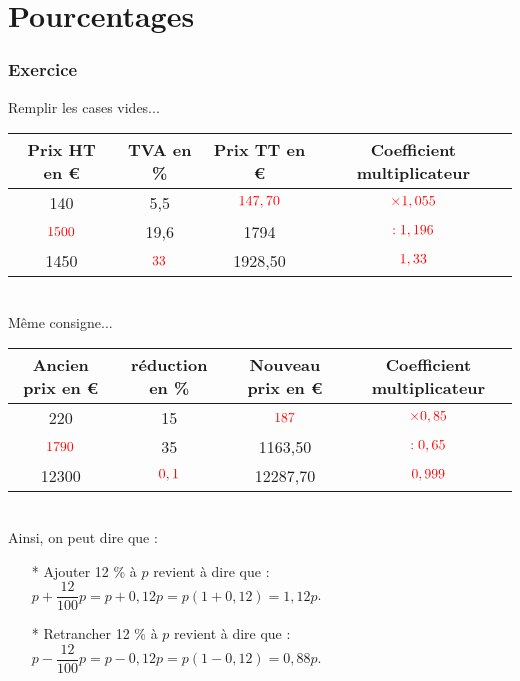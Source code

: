 \ifdefined\COMPLETE
\else
    
    
\fi


\setcounter{section}{0} 

\part{Pourcentages}

\section{Exercice }

Remplir les cases vides... \\

\begin{tabular}{c|c|c|c} 
Prix HT en € & TVA en \% & Prix TT en € & Coefficient multiplicateur \\
\hline
140 & 5,5 & $\textcolor{red}{147,70}$ & $\textcolor{red}{\times 1,055}$ \\
$\textcolor{red}{1500}$& 19,6 & 1794 & $\textcolor{red}{: 1,196}$ \\
1450 & $\textcolor{red}{33}$ & 1928,50 & $\textcolor{red}{1,33}$ \\
\end{tabular} \\

Même consigne... \\

\begin{tabular}{c|c|c|c} 
Ancien prix en € & réduction en \% & Nouveau prix en € & Coefficient multiplicateur \\
\hline
220 & 15 & $\textcolor{red}{187}$ & $\textcolor{red}{\times 0,85}$ \\
$\textcolor{red}{1790}$& 35 & 1163,50 & $\textcolor{red}{: 0,65}$ \\
12300 & $\textcolor{red}{0,1}$ & 12287,70 & $\textcolor{red}{0,999}$ \\
\end{tabular} \\

Ainsi, on peut dire que : 

\begin{enumerate}
\item[*] Ajouter 12 \% à $p$ revient à dire que : $ p + \dfrac{12}{100}p = p + 0,12p = p \left(1 + 0,12\right) = 1,12 p$.
\item[*] Retrancher 12 \% à $p$ revient à dire que : $ p - \dfrac{12}{100}p = p - 0,12p = p \left(1 - 0,12\right) = 0,88 p$.
\end{enumerate}

